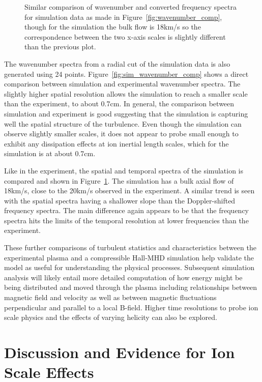 \documentclass[preprint2]{aastex}
\begin{document}
\begin{figure}
\caption{\label{fig:sim_spatial_comp} Similar comparison of wavenumber and converted frequency spectra for simulation data as made in Figure~\ref{fig:wavenumber_comp}, though for the simulation the bulk flow is 18km/s so the correspondence between the two x-axis scales is slightly different than the previous plot.}
\end{figure}

The wavenumber spectra from a radial cut of the simulation data is also generated using 24 points. Figure~\ref{fig:sim_wavenumber_comp} shows a direct comparison between simulation and experimental wavenumber spectra. The slightly higher spatial resolution allows the simulation to reach a smaller scale than the experiment, to about 0.7cm. In general, the comparison between simulation and experiment is good suggesting that the simulation is capturing well the spatial structure of the turbulence. Even though the simulation can observe slightly smaller scales, it does not appear to probe small enough to exhibit any dissipation effects at ion inertial length scales, which for the simulation is at about 0.7cm.

Like in the experiment, the spatial and temporal spectra of the simulation is compared and shown in Figure~\ref{fig:sim_spatial_comp}. The simulation has a bulk axial flow of 18km/s, close to the 20km/s observed in the experiment. A similar trend is seen with the spatial spectra having a shallower slope than the Doppler-shifted frequency spectra. The main difference again appears to be that the frequency spectra hits the limits of the temporal resolution at lower frequencies than the experiment.

These further comparisons of turbulent statistics and characteristics between the experimental plasma and a compressible Hall-MHD simulation help validate the model as useful for understanding the physical processes. Subsequent simulation analysis will likely entail more detailed computation of how energy might be being distributed and moved through the plasma including relationships between magnetic field and velocity as well as between magnetic fluctuations perpendicular and parallel to a local B-field. Higher time resolutions to probe ion scale physics and the effects of varying helicity can also be explored.

\section{Discussion and Evidence for Ion Scale Effects}\label{sec:ionscale}
\end{document}
